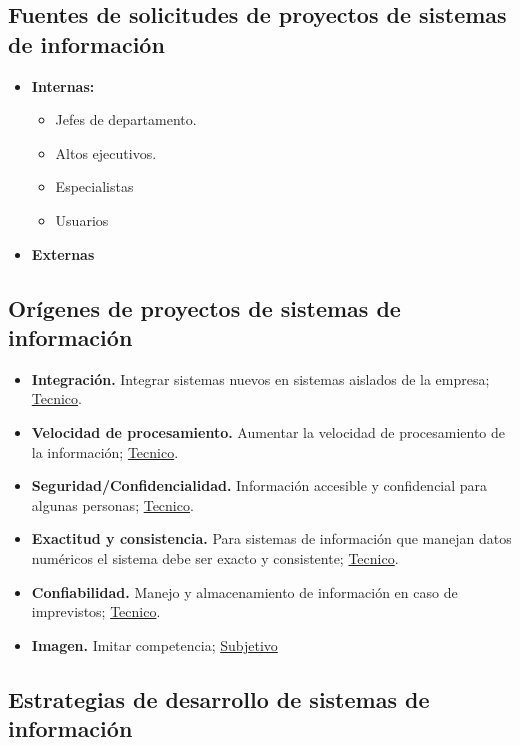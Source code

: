 \documentclass{templateNote}
\begin{document}
\subsection{Fuentes de solicitudes de proyectos de sistemas de información}
    \begin{itemize}
        \item \textbf{Internas:}
        \begin{itemize}
            \item Jefes de departamento.
            \item Altos ejecutivos.
            \item Especialistas
            \item Usuarios
        \end{itemize}
        \item \textbf{Externas} 
    \end{itemize}
\subsection{Orígenes de proyectos de sistemas de información}
\begin{itemize}
    \item \textbf{Integración.} Integrar sistemas nuevos en sistemas aislados de la empresa; \underline{Tecnico}.
    \item \textbf{Velocidad de procesamiento.} Aumentar la velocidad de procesamiento de la información; \underline{Tecnico}.
    \item \textbf{Seguridad/Confidencialidad.} Información accesible y confidencial para algunas personas; \underline{Tecnico}.
    \item \textbf{Exactitud y consistencia.} Para sistemas de información que manejan datos numéricos el sistema debe ser exacto y consistente; \underline{Tecnico}.
    \item \textbf{Confiabilidad.} Manejo y almacenamiento de información en caso de imprevistos; \underline{Tecnico}.
    \item \textbf{Imagen.} Imitar competencia; \underline{Subjetivo}
\end{itemize}
\newpage
\subsection{Estrategias de desarrollo de sistemas de información}
\end{document}
